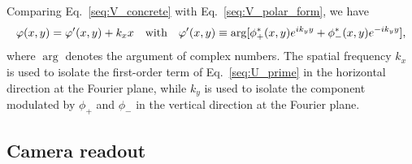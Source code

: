\documentclass[aps,pra,10pt,showpacs,amsmath,amssymb,floatfix,superscriptaddress,twocolumn]{revtex4-2}
\begin{document}
Comparing Eq.~\eqref{seq:V_concrete} with Eq.~\eqref{seq:V_polar_form}, we have
\begin{equation} \label{seq:phi}
    \varphi(x,y) = \varphi'(x,y) + k_x x
    \qq{with}
    \varphi'(x,y) \equiv \arg[\phi_+^*(x, y) e^{i k_y y} + \phi_-^*(x, y) e^{- i k_y y}],
\end{equation}
where \(\arg\) denotes the argument of complex numbers.
The spatial frequency $k_x$ is used to isolate the first-order term of Eq.~\eqref{seq:U_prime} in the horizontal direction at the Fourier plane, while $k_y$ is used to isolate the component modulated by \(\phi_+\) and \(\phi_-\) in the vertical direction at the Fourier plane.


\subsection{Camera readout}
\end{document}
